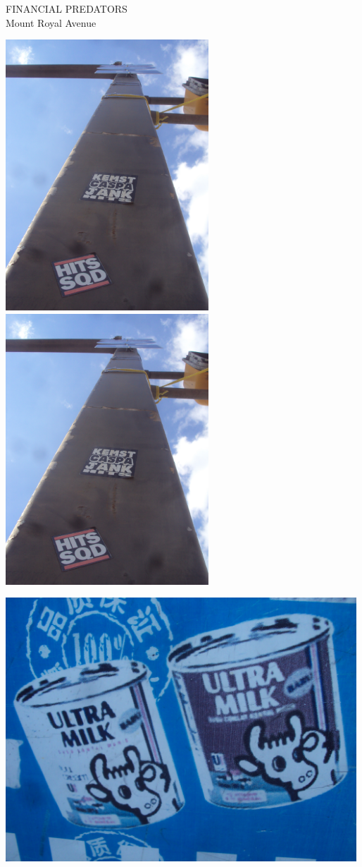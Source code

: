 \documentclass[10pt,letterpaper]{article}
\begin{document}
FINANCIAL PREDATORS\\
Mount Royal Avenue\\
\pagebreak

\includegraphics[height=4in]{portrait.jpg}
\includegraphics[height=4in]{portrait.jpg}

\vspace{0.25in}
\includegraphics[width=5.19in]{landscape.jpg}
\end{document}
